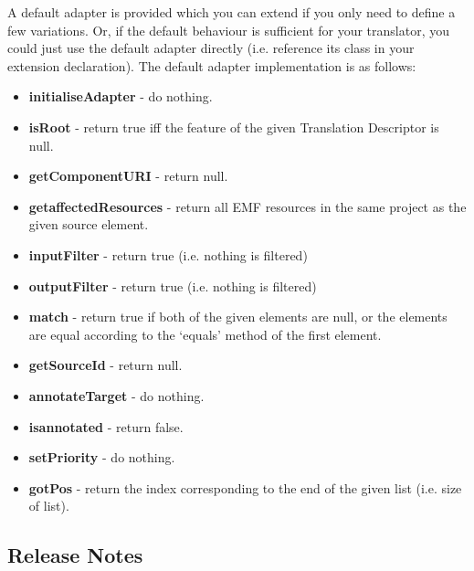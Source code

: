 A default adapter is provided which you can extend if you only need to define a few variations.
Or, if the default behaviour is sufficient for your translator, you could just use the default adapter directly (i.e. reference its class in your extension declaration).
The default adapter implementation is as follows:
\begin{itemize}
\item \textbf{initialiseAdapter} - do nothing.
\item \textbf{isRoot} - return true iff the feature of the given Translation Descriptor is null.
\item \textbf{getComponentURI} - return null.
\item \textbf{getaffectedResources} -  return all EMF resources in the same project as the given source element.
\item \textbf{inputFilter} -  return true (i.e. nothing is filtered)
\item \textbf{outputFilter} -  return true (i.e. nothing is filtered)
\item \textbf{match} -  return true if both of the given elements are null, or the elements are equal according to the `equals' method of the first element.
\item \textbf{getSourceId} - return null.
\item \textbf{annotateTarget} - do nothing.
\item \textbf{isannotated} - return false.
\item \textbf{setPriority} - do nothing.
\item \textbf{gotPos} - return the index corresponding to the end of the given list (i.e. size of list).
\end{itemize}

\subsection{Release Notes}
\label{sec:release-notes}

